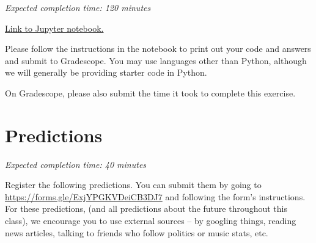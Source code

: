 \documentclass[11pt]{article}
\begin{document}
\emph{Expected completion time: 120 minutes}

\href{http://datahub.berkeley.edu/hub/user-redirect/git-pull?repo=https%3A%2F%2Fgithub.com%2Fjs-d%2Fforecasting-class-sp23&urlpath=tree%2Fforecasting-class-sp23%2Fhw%2Fhw5%2Fhw5lab.ipynb&branch=main}{Link to Jupyter notebook.}

Please follow the instructions in the notebook to print out your code and answers and submit to Gradescope. You may use languages other than Python, although we will generally be providing starter code in Python.

On Gradescope, please also submit the time it took to complete this exercise.

\section*{Predictions}

\emph{Expected completion time: 40 minutes}

Register the following predictions. You can submit them by going to \url{https://forms.gle/ExjYPGKVDeiCB3DJ7} and following the form's instructions. For these predictions, (and all predictions about the future throughout this class), we encourage you to use external sources -- by googling things, reading news articles, talking to friends who follow politics or music stats, etc.
\end{document}
